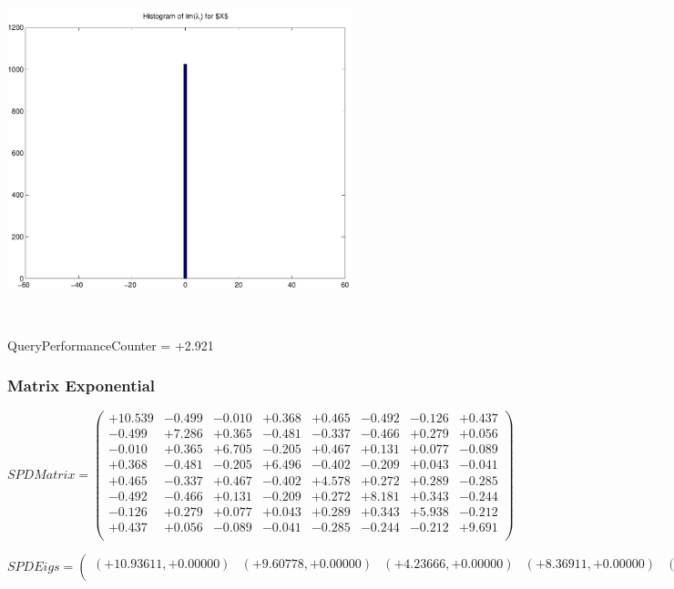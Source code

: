 \documentclass[9pt]{article}
\theoremstyle{plain}
\theoremstyle{definition}
\theoremstyle{remark}
\numberwithin{equation}{section}
\begin{document}
\includegraphics[width=10.0cm,height=10.0cm]{Im_lambda_n.pdf}

QueryPerformanceCounter  =  +2.921
\subsubsection{Matrix Exponential }
$SPD Matrix = \left(
\begin{array}{
cccccccc}
+10.539 & -0.499 & -0.010 & +0.368 & +0.465 & -0.492 & -0.126 & +0.437 \\
-0.499 & +7.286 & +0.365 & -0.481 & -0.337 & -0.466 & +0.279 & +0.056 \\
-0.010 & +0.365 & +6.705 & -0.205 & +0.467 & +0.131 & +0.077 & -0.089 \\
+0.368 & -0.481 & -0.205 & +6.496 & -0.402 & -0.209 & +0.043 & -0.041 \\
+0.465 & -0.337 & +0.467 & -0.402 & +4.578 & +0.272 & +0.289 & -0.285 \\
-0.492 & -0.466 & +0.131 & -0.209 & +0.272 & +8.181 & +0.343 & -0.244 \\
-0.126 & +0.279 & +0.077 & +0.043 & +0.289 & +0.343 & +5.938 & -0.212 \\
+0.437 & +0.056 & -0.089 & -0.041 & -0.285 & -0.244 & -0.212 & +9.691 \\
\end{array}
\right)$ \newline 

$SPD Eigs = \left(
\begin{array}{
cccccccc}
(+10.93611,+0.00000) & (+9.60778,+0.00000) & (+4.23666,+0.00000) & (+8.36911,+0.00000) & (+7.56229,+0.00000) & (+5.82791,+0.00000) & (+6.54198,+0.00000) & (+6.33139,+0.00000) \\
\end{array}
\right)$ \newline 
\end{document}
